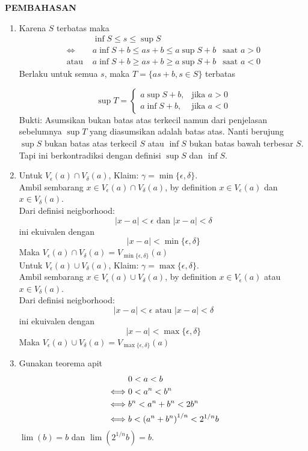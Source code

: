 \documentclass{article}
\begin{document}
\newpage
\begin{center}
\textbf{\large{PEMBAHASAN}}
\end{center}
\begin{enumerate}[leftmargin=*, label={\arabic*}.]
\item Karena $S$ terbatas maka
\begin{align*}
    &\inf S \leq s \leq \sup S\\
    \iff &a \inf S + b \leq as+b \leq a \sup S + b &\text{saat $a>0$}\\
    \text{atau } &a \inf S + b \geq as+b \geq a \sup S + b &\text{saat $a<0$}
\end{align*}
Berlaku untuk semua $s$, maka $T=\{as+b, s\in S\}$ terbatas


\[\sup T=
\begin{cases}
    a \sup S + b, &\text{jika $a > 0$}\\
    a \inf S + b, &\text{jika $a < 0$}    
\end{cases}\]
Bukti: Asumsikan bukan batas atas terkecil namun dari penjelasan sebelumnya 
$\sup T$ yang diasumsikan adalah batas atas. Nanti berujung $\sup S$ 
bukan batas atas terkecil $S$ atau $\inf S$ bukan batas bawah terbesar $S$. 
Tapi ini berkontradiksi dengan definisi $\sup S$ dan $\inf S$.

\item Untuk $V_\epsilon (a)\cap V_\delta(a)$, Klaim: $\gamma = \min\{\epsilon, \delta\}$.\\
Ambil sembarang $x \in V_\epsilon (a)\cap V_\delta(a)$, by definition $x \in V_\epsilon (a)$ dan $x \in V_\delta(a)$.\\
Dari definisi neigborhood:
\[
    |x-a| < \epsilon \text{ dan } |x-a| < \delta
\]
ini ekuivalen dengan 
\[
    |x-a| < \min\{\epsilon, \delta\}
\]
Maka $V_\epsilon (a)\cap V_\delta(a) = V_{\min\{\epsilon, \delta\}}(a)$\\

Untuk $V_\epsilon (a)\cup V_\delta(a)$, Klaim: $\gamma = \max\{\epsilon, \delta\}$.\\
Ambil sembarang $x \in V_\epsilon (a)\cup V_\delta(a)$, by definition $x \in V_\epsilon (a)$ atau $x \in V_\delta(a)$.\\
Dari definisi neigborhood:
\[
    |x-a| < \epsilon \text{ atau } |x-a| < \delta
\]
ini ekuivalen dengan 
\[
    |x-a| < \max\{\epsilon, \delta\}
\]
Maka $V_\epsilon (a)\cup V_\delta(a) = V_{\max\{\epsilon, \delta\}}(a)$

\item Gunakan teorema apit
\begin{align*}
    &0 < a < b\\
    \iff& 0 < a^n < b^n\\
    \iff& b^n < a^n+b^n < 2b^n\\
    \iff& b < \oio*{a^n+b^n}^{1/n} < 2^{1/n}b
\end{align*}
$\lim (b) = b$ dan $\lim (2^{1/n}b) = b$.

\end{enumerate}
\end{document}
